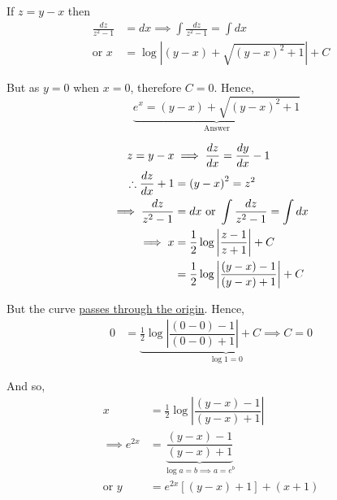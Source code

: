 \documentclass[14pt,fleqn]{extarticle}
\newcommand\ymx{\left(y-x \right)}
\begin{document}
\begin{question}
\begin{step}
\begin{options}
     If $z = y-x$ then 
     \begin{align}
	\frac{dz}{z^2-1} &= dx \implies \int \frac{dz}{z^2-1} = \int dx \\
	\text{or } x &= \log\left\vert \ymx + \sqrt{\ymx^2 + 1}\right\vert + C
\end{align}

But as $y = 0$ when $x=0$, therefore $C = 0$. Hence, 
\[ \quad \underbrace{e^x = \ymx + \sqrt{\ymx^2 + 1}}_{\text{Answer}}\]   
    \end{options} 
     \reason 
     
     \begin{align}
     z = y -x &\implies \frac{dz}{dx} = \dydx - 1\\
     \therefore \frac{dz}{dx} + 1 &= \ymx^2 = z^2  \\
     \implies \frac{dz}{z^2 - 1} &= dx \text{ or } \int \frac{dz}{z^2 - 1} = \int dx \\
     \implies x &= \frac{1}{2} \log \left\vert \dfrac{z-1}{z + 1}\right\vert + C \\
     &= \frac{1}{2}\log \left\vert \dfrac{\ymx - 1}{\ymx+ 1} \right\vert + C 
\end{align}

But the curve \underline{passes through the origin}. Hence,
\begin{align}
0 &= \underbrace{\frac{1}{2}\log \left\vert\dfrac{(0-0) - 1}{(0-0) + 1} \right\vert + C \implies C = 0}_{\log 1 = 0}
\end{align}

And so, 
\begin{align}
x &= \frac{1}{2}\log\left\vert \dfrac{\ymx - 1}{\ymx + 1}\right\vert  \\
\implies e^{2x} &= \underbrace{\dfrac{\ymx - 1}{\ymx + 1}}_{\log a = b \implies a = e^b} \\
\text{or } y &= e^{2x} \left[\ymx+1 \right] + \left(x+1 \right)
\end{align}
       
\end{step}
\end{question} 
\end{document}
